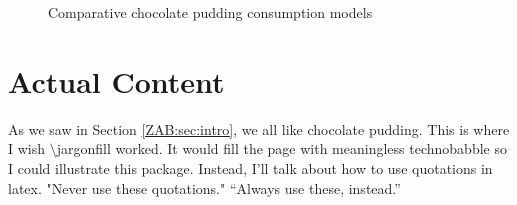 \documentclass{ccr15}
\begin{document}
\begin{figure}[htb]
\begin{center}
  \caption{Comparative chocolate pudding consumption
models}
\end{center}\end{figure}

\section{Actual Content}

As we saw in Section \ref{ZAB:sec:intro}, we all like chocolate pudding. This is where I wish
\textsf{$\setminus$jargonfill} worked. It would fill the page with meaningless technobabble so I could illustrate this
package. Instead, I'll talk about how to use quotations in latex. "Never use these quotations." ``Always use these,
instead.''
\end{document}
